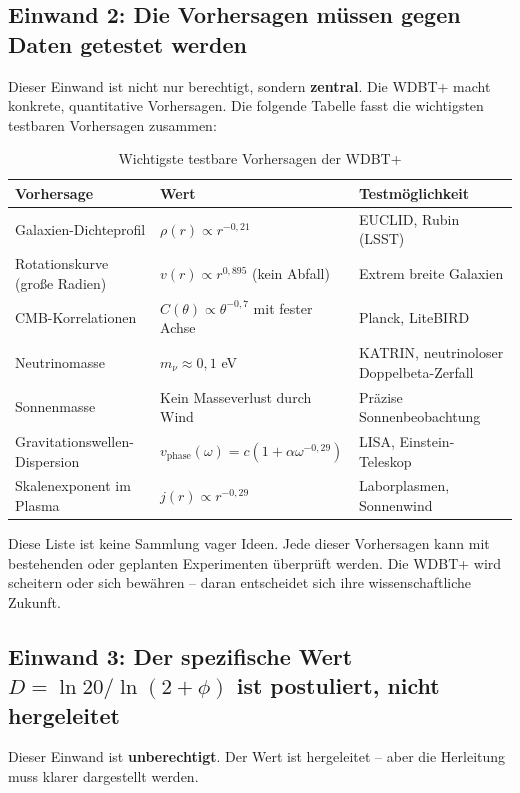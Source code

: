 \documentclass[12pt,a4paper]{article}
\begin{document}
\subsection{Einwand 2: Die Vorhersagen müssen gegen Daten getestet werden}

Dieser Einwand ist nicht nur berechtigt, sondern \textbf{zentral}. Die WDBT+ macht konkrete, quantitative Vorhersagen. Die folgende Tabelle fasst die wichtigsten testbaren Vorhersagen zusammen:

\begin{table}[ht]
\centering
\caption{Wichtigste testbare Vorhersagen der WDBT+}
\begin{tabular}{p{5cm}p{3cm}p{5cm}}
\toprule
Vorhersage & Wert & Testmöglichkeit \\
\midrule
Galaxien-Dichteprofil & $\rho(r) \propto r^{-0,21}$ & EUCLID, Rubin (LSST) \\
Rotationskurve (große Radien) & $v(r) \propto r^{0,895}$ (kein Abfall) & Extrem breite Galaxien \\
CMB-Korrelationen & $C(\theta) \propto \theta^{-0,7}$ mit fester Achse & Planck, LiteBIRD \\
Neutrinomasse & $m_\nu \approx 0,1$ eV & KATRIN, neutrinoloser Doppelbeta-Zerfall \\
Sonnenmasse & Kein Masseverlust durch Wind & Präzise Sonnenbeobachtung \\
Gravitationswellen-Dispersion & $v_{\text{phase}}(\omega) = c(1 + \alpha \omega^{-0,29})$ & LISA, Einstein-Teleskop \\
Skalenexponent im Plasma & $j(r) \propto r^{-0,29}$ & Laborplasmen, Sonnenwind \\
\bottomrule
\end{tabular}
\end{table}

Diese Liste ist keine Sammlung vager Ideen. Jede dieser Vorhersagen kann mit bestehenden oder geplanten Experimenten überprüft werden. Die WDBT+ wird scheitern oder sich bewähren -- daran entscheidet sich ihre wissenschaftliche Zukunft.

\subsection{Einwand 3: Der spezifische Wert $D = \ln 20 / \ln(2+\phi)$ ist postuliert, nicht hergeleitet}

Dieser Einwand ist \textbf{unberechtigt}. Der Wert ist hergeleitet -- aber die Herleitung muss klarer dargestellt werden.
\end{document}
